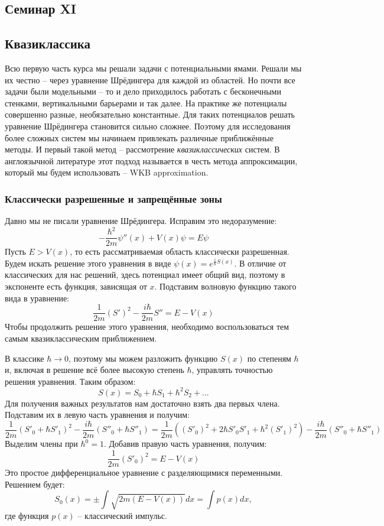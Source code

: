 \begin{center}
    \section{Семинар XI}
\end{center}
\subsection{Квазиклассика}
\hspace{1em} Всю первую часть курса мы решали задачи с потенциальными ямами. Решали мы их честно -- через уравнение Шрёдингера для каждой из областей. Но почти все задачи были модельными -- то и дело приходилось работать с бесконечными стенками, вертикальными барьерами и так далее. На практике же потенциалы совершенно разные, необязательно константные. Для таких потенциалов решать уравнение Шрёдингера становится сильно сложнее. Поэтому для исследования более сложных систем мы начинаем привлекать различные приближённые методы. И первый такой метод -- рассмотрение \textit{квазиклассических} систем. В англоязычной литературе этот подход называется в честь метода аппроксимации, который мы будем использовать -- WKB approximation.

\subsubsection{Классически разрешенные и запрещённые зоны}
\hspace{1em} Давно мы не писали уравнение Шрёдингера. Исправим это недоразумение:
\[
-\frac{\hbar^2}{2m}\psi''(x) + V(x)\psi = E\psi
\]
Пусть $E > V(x)$, то есть рассматриваемая область классически разрешенная. Будем искать решение этого уравнения в виде $\psi(x) = e^{\frac{i}{\hbar}S(x)}$. В отличие от классических для нас решений, здесь потенциал имеет общий вид, поэтому в экспоненте есть функция, зависящая от $x$. Подставим волновую функцию такого вида в уравнение:
\[
\frac{1}{2m}(S')^2 - \frac{i\hbar}{2m}S'' = E - V(x)
\]
Чтобы продолжить решение этого уравнения, необходимо воспользоваться тем самым квазиклассическим приближением. 

В классике $\hbar \rightarrow 0$, поэтому мы можем разложить функцию $S(x)$ по степеням $\hbar$ и, включая в решение всё более высокую степень $\hbar$, управлять точностью решения уравнения. Таким образом:
\[
S(x) = S_0 + \hbar S_1 + \hbar^2 S_2 + ...
\]
Для получения важных результатов нам достаточно взять два первых члена. Подставим их в левую часть уравнения и получим:
\[
\frac{1}{2m}\left( S'_0 + \hbar S'_1 \right)^2 - \frac{i\hbar}{2m}(S''_0 + \hbar S''_1) = \frac{1}{2m}\left( (S'_0)^2 + 2\hbar S'_0 S'_1 + \hbar^2 (S'_1)^2 \right) - \frac{i\hbar}{2m}(S''_0 + \hbar S''_1)
\]
Выделим члены при $\hbar^0 = 1$. Добавив правую часть уравнения, получим:
\[
\frac{1}{2m}(S'_0)^2 = E - V(x)
\]
Это простое дифференциальное уравнение с разделяющимися переменными. Решением будет:
\[
S_0(x) = \pm \int\sqrt{2m\left( E - V(x) \right)}dx = \int p(x)dx,
\]
где функция $p(x)$ -- классический импульс. 

